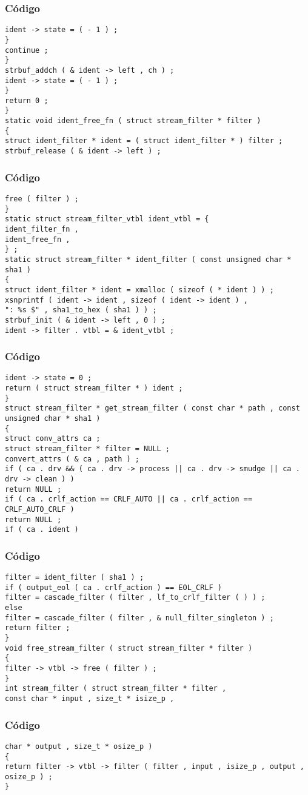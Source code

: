 \documentclass{beamer}
\begin{document}
\begin{frame}[fragile]
\frametitle{C\'odigo}
\begin{verbatim}
ident -> state = ( - 1 ) ; 
} 
continue ; 
} 
strbuf_addch ( & ident -> left , ch ) ; 
ident -> state = ( - 1 ) ; 
} 
return 0 ; 
} 
static void ident_free_fn ( struct stream_filter * filter ) 
{ 
struct ident_filter * ident = ( struct ident_filter * ) filter ; 
strbuf_release ( & ident -> left ) ; 
\end{verbatim}
\end{frame}
\begin{frame}[fragile]
\frametitle{C\'odigo}
\begin{verbatim}
free ( filter ) ; 
} 
static struct stream_filter_vtbl ident_vtbl = { 
ident_filter_fn , 
ident_free_fn , 
} ; 
static struct stream_filter * ident_filter ( const unsigned char * sha1 ) 
{ 
struct ident_filter * ident = xmalloc ( sizeof ( * ident ) ) ; 
xsnprintf ( ident -> ident , sizeof ( ident -> ident ) , 
": %s $" , sha1_to_hex ( sha1 ) ) ; 
strbuf_init ( & ident -> left , 0 ) ; 
ident -> filter . vtbl = & ident_vtbl ; 
\end{verbatim}
\end{frame}
\begin{frame}[fragile]
\frametitle{C\'odigo}
\begin{verbatim}
ident -> state = 0 ; 
return ( struct stream_filter * ) ident ; 
} 
struct stream_filter * get_stream_filter ( const char * path , const unsigned char * sha1 ) 
{ 
struct conv_attrs ca ; 
struct stream_filter * filter = NULL ; 
convert_attrs ( & ca , path ) ; 
if ( ca . drv && ( ca . drv -> process || ca . drv -> smudge || ca . drv -> clean ) ) 
return NULL ; 
if ( ca . crlf_action == CRLF_AUTO || ca . crlf_action == CRLF_AUTO_CRLF ) 
return NULL ; 
if ( ca . ident ) 
\end{verbatim}
\end{frame}
\begin{frame}[fragile]
\frametitle{C\'odigo}
\begin{verbatim}
filter = ident_filter ( sha1 ) ; 
if ( output_eol ( ca . crlf_action ) == EOL_CRLF ) 
filter = cascade_filter ( filter , lf_to_crlf_filter ( ) ) ; 
else 
filter = cascade_filter ( filter , & null_filter_singleton ) ; 
return filter ; 
} 
void free_stream_filter ( struct stream_filter * filter ) 
{ 
filter -> vtbl -> free ( filter ) ; 
} 
int stream_filter ( struct stream_filter * filter , 
const char * input , size_t * isize_p , 
\end{verbatim}
\end{frame}
\begin{frame}[fragile]
\frametitle{C\'odigo}
\begin{verbatim}
char * output , size_t * osize_p ) 
{ 
return filter -> vtbl -> filter ( filter , input , isize_p , output , osize_p ) ; 
} \end{verbatim}
\end{frame}
\end{document}
